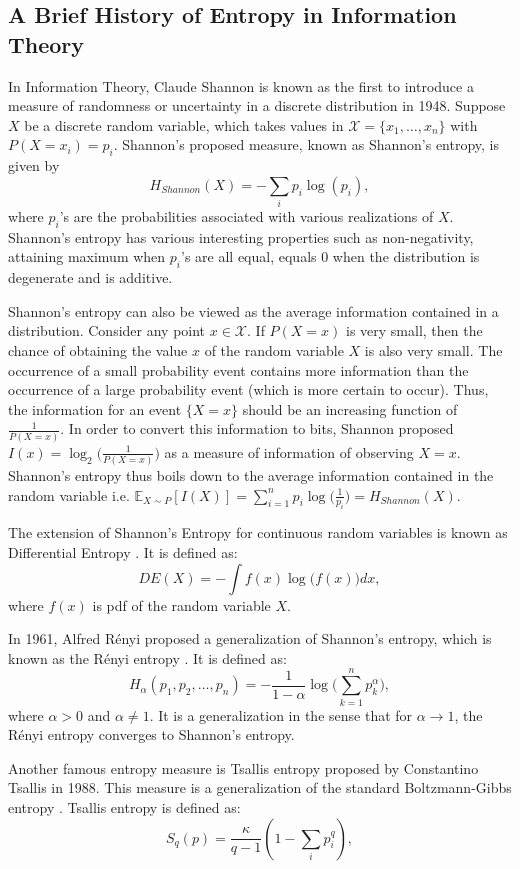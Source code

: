 \documentclass{article}
\begin{document}
\subsection{A Brief History of Entropy in Information Theory}
In Information Theory, Claude Shannon \citep{shannon1948mathematical} is known as the first to introduce a measure of randomness or uncertainty in a discrete distribution in 1948. Suppose $X$ be a discrete random variable, which takes values in $\mathcal{X}=\{x_1,\dots,x_n\}$ with $P(X=x_i)=p_i$. Shannon's proposed measure, known as Shannon's entropy, is given by $$H_{Shannon}(X)=-\sum_ip_i \log(p_i),$$ where $p_i$'s are the probabilities associated with various realizations of $X$. Shannon's entropy has various interesting properties such as non-negativity, attaining maximum when $p_i$'s are all equal, equals $0$ when the distribution is degenerate and is additive.
\par
Shannon's entropy can also be viewed as the average information contained in a distribution. Consider any point $x \in \mathcal{X}$. If $P(X=x)$ is very small, then the chance of obtaining the value $x$ of the random variable $X$ is also very small. The occurrence of a small probability event contains more information than the occurrence of a large probability event (which is more certain to occur). Thus, the information for an event $\{X=x\}$ should be an increasing function of $\frac{1}{P(X=x)}$. In order to convert this information to bits, Shannon proposed $I(x)=\log_2\big(\frac{1}{P(X=x)}\big)$ as a measure of information of observing $X=x$. Shannon's entropy thus boils down to the average information contained in the random variable i.e. $\mathbb{E}_{X \sim P} [I(X)]=\sum_{i=1}^n p_i \log\big(\frac{1}{p_i}\big)=H_{Shannon}(X)$. 
\par
The extension of Shannon's Entropy for continuous random variables is known as Differential Entropy \citep{cover2012elements}. It is defined as: $$DE(X)=-\int f(x)\log\big(f(x)\big)dx,$$ where $f(x)$ is pdf of the random variable $X$.\par
In 1961, Alfred R\'enyi proposed a generalization of Shannon's entropy, which is known as the R\'enyi entropy \citep{renyi1961measures}. It is defined as: 
$$H_{\alpha}(p_1,p_2,\dots,p_n)=-\frac{1}{1-\alpha}\log\bigg(\sum_{k=1}^n p_k^{\alpha}\bigg),$$
where $\alpha >0$ and $\alpha \neq 1$. It is a generalization in the sense that for $\alpha \rightarrow 1$, the R\'enyi entropy converges to Shannon's entropy.\par
Another famous entropy measure is Tsallis entropy \citep{tsallis1988possible} proposed by Constantino Tsallis in 1988. This measure is a generalization of the standard Boltzmann-Gibbs entropy \citep{jaynes1965gibbs}. Tsallis entropy is defined as: $$S_q(p)=\frac{\kappa}{q-1}(1-\sum_i p_i^q),$$
\end{document}
